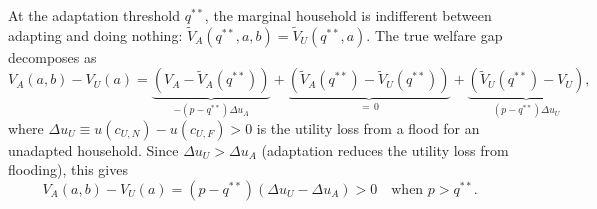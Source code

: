 \documentclass{article}
\begin{document}
At the adaptation threshold $q^{**}$, the marginal household is indifferent between adapting and doing nothing: $\tilde{V}_A(q^{**},a,b) = \tilde{V}_U(q^{**},a)$. The true welfare gap decomposes as
\begin{equation}
    V_A(a,b) - V_U(a) = \underbrace{(V_A - \tilde{V}_A(q^{**}))}_{-(p-q^{**})\Delta u_A}
    + \underbrace{(\tilde{V}_A(q^{**}) - \tilde{V}_U(q^{**}))}_{=\,0}
    + \underbrace{(\tilde{V}_U(q^{**}) - V_U)}_{(p-q^{**})\Delta u_U},
\end{equation}
where $\Delta u_U \equiv u(c_{U,N}) - u(c_{U,F}) > 0$ is the utility loss from a flood for an unadapted household. Since $\Delta u_U > \Delta u_A$ (adaptation reduces the utility loss from flooding), this gives
\begin{equation}
    V_A(a,b) - V_U(a) = (p - q^{**})(\Delta u_U - \Delta u_A) > 0 \quad \text{when } p > q^{**}.
    \label{eq:internality_adaptation}
\end{equation}
\end{document}
